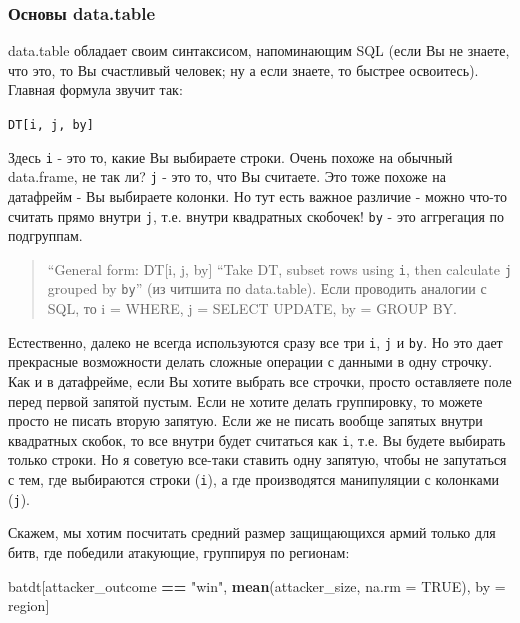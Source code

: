 \documentclass[]{book}
\newenvironment{Shaded}{\begin{snugshade}}{\end{snugshade}}
\newcommand{\KeywordTok}[1]{\textcolor[rgb]{0.13,0.29,0.53}{\textbf{#1}}}
\newcommand{\DataTypeTok}[1]{\textcolor[rgb]{0.13,0.29,0.53}{#1}}
\newcommand{\StringTok}[1]{\textcolor[rgb]{0.31,0.60,0.02}{#1}}
\newcommand{\OtherTok}[1]{\textcolor[rgb]{0.56,0.35,0.01}{#1}}
\newcommand{\OperatorTok}[1]{\textcolor[rgb]{0.81,0.36,0.00}{\textbf{#1}}}
\newcommand{\NormalTok}[1]{#1}
\begin{document}
\subsubsection{Основы data.table}\label{base_dt}

data.table обладает своим синтаксисом, напоминающим SQL (если Вы не
знаете, что это, то Вы счастливый человек; ну а если знаете, то быстрее
освоитесь). Главная формула звучит так:

\texttt{DT{[}i,\ j,\ by{]}}

Здесь \texttt{i} - это то, какие Вы выбираете строки. Очень похоже на
обычный data.frame, не так ли? \texttt{j} - это то, что Вы считаете. Это
тоже похоже на датафрейм - Вы выбираете колонки. Но тут есть важное
различие - можно что-то считать прямо внутри \texttt{j}, т.е. внутри
квадратных скобочек! \texttt{by} - это аггрегация по подгруппам.

\begin{quote}
``General form: DT{[}i, j, by{]} ``Take DT, subset rows using
\texttt{i}, then calculate \texttt{j} grouped by \texttt{by}'' (из
читшита по data.table). Если проводить аналогии с SQL, то i = WHERE, j =
SELECT \textbar{} UPDATE, by = GROUP BY.
\end{quote}

Естественно, далеко не всегда используются сразу все три \texttt{i},
\texttt{j} и \texttt{by}. Но это дает прекрасные возможности делать
сложные операции с данными в одну строчку. Как и в датафрейме, если Вы
хотите выбрать все строчки, просто оставляете поле перед первой запятой
пустым. Если не хотите делать группировку, то можете просто не писать
вторую запятую. Если же не писать вообще запятых внутри квадратных
скобок, то все внутри будет считаться как \texttt{i}, т.е. Вы будете
выбирать только строки. Но я советую все-таки ставить одну запятую,
чтобы не запутаться с тем, где выбираются строки (\texttt{i}), а где
производятся манипуляции с колонками (\texttt{j}).

Скажем, мы хотим посчитать средний размер защищающихся армий только для
битв, где победили атакующие, группируя по регионам:

\begin{Shaded}
\begin{Highlighting}[]
\NormalTok{batdt[attacker_outcome }\OperatorTok{==}\StringTok{ "win"}\NormalTok{, }\KeywordTok{mean}\NormalTok{(attacker_size, }\DataTypeTok{na.rm =} \OtherTok{TRUE}\NormalTok{), by =}\StringTok{ }\NormalTok{region]}
\end{Highlighting}
\end{Shaded}
\end{document}
